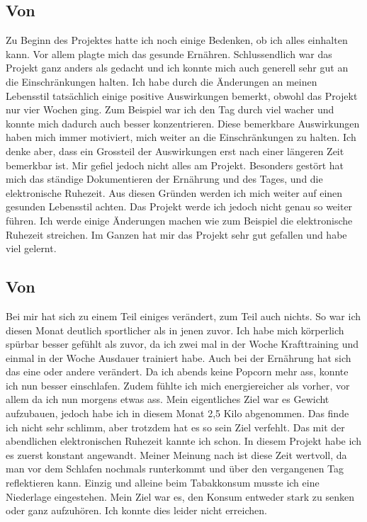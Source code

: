 \subsection{Von \dario}
\authortoc{\dario}{\subsectionident}
Zu Beginn des Projektes hatte ich noch einige Bedenken, ob ich alles einhalten kann. Vor allem plagte mich das gesunde Ernähren.
\newline
Schlussendlich war das Projekt ganz anders als gedacht und ich konnte mich auch generell sehr gut an die Einschränkungen halten. Ich habe durch die Änderungen an meinen Lebensstil tatsächlich einige positive Auswirkungen bemerkt, obwohl das Projekt nur vier Wochen ging. Zum Beispiel war ich den Tag durch viel wacher und konnte mich dadurch auch besser konzentrieren. Diese bemerkbare Auswirkungen haben mich immer motiviert, mich weiter an die Einschränkungen zu halten. Ich denke aber, dass ein Grossteil der Auswirkungen erst nach einer längeren Zeit bemerkbar ist. 
Mir gefiel jedoch nicht alles am Projekt. Besonders gestört hat mich das ständige Dokumentieren der Ernährung und des Tages, und die elektronische Ruhezeit. Aus diesen Gründen werden ich mich weiter auf einen gesunden Lebensstil achten. Das Projekt werde ich jedoch nicht genau so weiter führen. Ich werde einige Änderungen machen wie zum Beispiel die elektronische Ruhezeit streichen. 
\newline
Im Ganzen hat mir das Projekt sehr gut gefallen und habe viel gelernt.
\subsection{Von \jonas}
\authortoc{\jonas}{\subsectionident}
Bei mir hat sich zu einem Teil einiges verändert, zum Teil auch nichts. So war ich diesen Monat deutlich sportlicher als in jenen zuvor. Ich habe mich körperlich spürbar besser gefühlt als zuvor, da ich zwei mal in der Woche Krafttraining und einmal in der Woche Ausdauer trainiert habe.
\newline
Auch bei der Ernährung hat sich das eine oder andere verändert. Da ich abends keine Popcorn mehr ass, konnte ich nun besser einschlafen. Zudem fühlte ich mich energiereicher als vorher, vor allem da ich nun morgens etwas ass. Mein eigentliches Ziel war es Gewicht aufzubauen, jedoch habe ich in diesem Monat 2,5 Kilo abgenommen. Das finde ich nicht sehr schlimm, aber trotzdem hat es so sein Ziel verfehlt.
\newline
Das mit der abendlichen elektronischen Ruhezeit kannte ich schon. In diesem Projekt habe ich es zuerst konstant angewandt. Meiner Meinung nach ist diese Zeit wertvoll, da man vor dem Schlafen nochmals runterkommt und über den vergangenen Tag reflektieren kann.
\newline
\newline
Einzig und alleine beim Tabakkonsum musste ich eine Niederlage eingestehen. Mein Ziel war es, den Konsum entweder stark zu senken oder ganz aufzuhören. Ich konnte dies leider nicht erreichen.